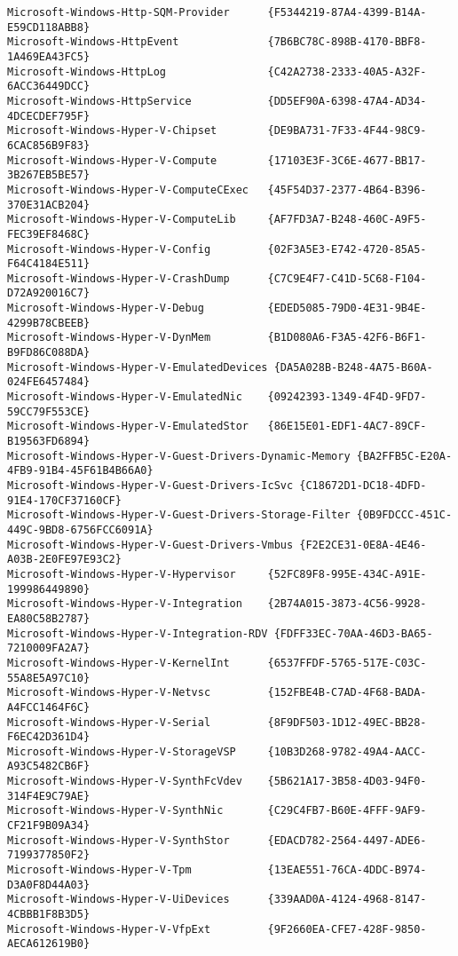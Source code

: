 \documentclass{report}
\begin{document}
\begin{lstlisting}[breaklines=true,basicstyle=\tiny]
Microsoft-Windows-Http-SQM-Provider      {F5344219-87A4-4399-B14A-E59CD118ABB8}
Microsoft-Windows-HttpEvent              {7B6BC78C-898B-4170-BBF8-1A469EA43FC5}
Microsoft-Windows-HttpLog                {C42A2738-2333-40A5-A32F-6ACC36449DCC}
Microsoft-Windows-HttpService            {DD5EF90A-6398-47A4-AD34-4DCECDEF795F}
Microsoft-Windows-Hyper-V-Chipset        {DE9BA731-7F33-4F44-98C9-6CAC856B9F83}
Microsoft-Windows-Hyper-V-Compute        {17103E3F-3C6E-4677-BB17-3B267EB5BE57}
Microsoft-Windows-Hyper-V-ComputeCExec   {45F54D37-2377-4B64-B396-370E31ACB204}
Microsoft-Windows-Hyper-V-ComputeLib     {AF7FD3A7-B248-460C-A9F5-FEC39EF8468C}
Microsoft-Windows-Hyper-V-Config         {02F3A5E3-E742-4720-85A5-F64C4184E511}
Microsoft-Windows-Hyper-V-CrashDump      {C7C9E4F7-C41D-5C68-F104-D72A920016C7}
Microsoft-Windows-Hyper-V-Debug          {EDED5085-79D0-4E31-9B4E-4299B78CBEEB}
Microsoft-Windows-Hyper-V-DynMem         {B1D080A6-F3A5-42F6-B6F1-B9FD86C088DA}
Microsoft-Windows-Hyper-V-EmulatedDevices {DA5A028B-B248-4A75-B60A-024FE6457484}
Microsoft-Windows-Hyper-V-EmulatedNic    {09242393-1349-4F4D-9FD7-59CC79F553CE}
Microsoft-Windows-Hyper-V-EmulatedStor   {86E15E01-EDF1-4AC7-89CF-B19563FD6894}
Microsoft-Windows-Hyper-V-Guest-Drivers-Dynamic-Memory {BA2FFB5C-E20A-4FB9-91B4-45F61B4B66A0}
Microsoft-Windows-Hyper-V-Guest-Drivers-IcSvc {C18672D1-DC18-4DFD-91E4-170CF37160CF}
Microsoft-Windows-Hyper-V-Guest-Drivers-Storage-Filter {0B9FDCCC-451C-449C-9BD8-6756FCC6091A}
Microsoft-Windows-Hyper-V-Guest-Drivers-Vmbus {F2E2CE31-0E8A-4E46-A03B-2E0FE97E93C2}
Microsoft-Windows-Hyper-V-Hypervisor     {52FC89F8-995E-434C-A91E-199986449890}
Microsoft-Windows-Hyper-V-Integration    {2B74A015-3873-4C56-9928-EA80C58B2787}
Microsoft-Windows-Hyper-V-Integration-RDV {FDFF33EC-70AA-46D3-BA65-7210009FA2A7}
Microsoft-Windows-Hyper-V-KernelInt      {6537FFDF-5765-517E-C03C-55A8E5A97C10}
Microsoft-Windows-Hyper-V-Netvsc         {152FBE4B-C7AD-4F68-BADA-A4FCC1464F6C}
Microsoft-Windows-Hyper-V-Serial         {8F9DF503-1D12-49EC-BB28-F6EC42D361D4}
Microsoft-Windows-Hyper-V-StorageVSP     {10B3D268-9782-49A4-AACC-A93C5482CB6F}
Microsoft-Windows-Hyper-V-SynthFcVdev    {5B621A17-3B58-4D03-94F0-314F4E9C79AE}
Microsoft-Windows-Hyper-V-SynthNic       {C29C4FB7-B60E-4FFF-9AF9-CF21F9B09A34}
Microsoft-Windows-Hyper-V-SynthStor      {EDACD782-2564-4497-ADE6-7199377850F2}
Microsoft-Windows-Hyper-V-Tpm            {13EAE551-76CA-4DDC-B974-D3A0F8D44A03}
Microsoft-Windows-Hyper-V-UiDevices      {339AAD0A-4124-4968-8147-4CBBB1F8B3D5}
Microsoft-Windows-Hyper-V-VfpExt         {9F2660EA-CFE7-428F-9850-AECA612619B0}

\end{lstlisting}
\end{document}
